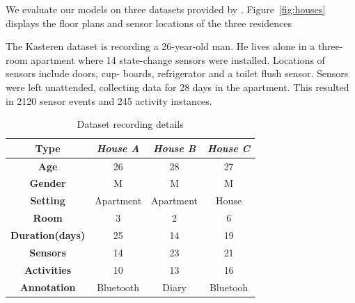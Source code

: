 We evaluate our models on three datasets provided by \cite{tvkasteren2010}.
Figure~\ref{fig:houses} displays the floor plans and sensor locations of the three residences 

The Kasteren dataset is recording a 26-year-old man. He lives alone in a three-room apartment where 14 state-change sensors were installed. Locations of sensors include doors, cup- boards, refrigerator and a toilet flush sensor. Sensors were left unattended, collecting data for 28 days in the apartment. This resulted in 2120 sensor events and 245 activity instances.


%

 
\begin{table}[t!]
\small
\begin{center}
\begin{tabular}{|c|c|c|c|}
\hline
\textbf{Type} & \emph{House A} & \emph{House B} & \emph{House C}\\ \hline
\textbf{Age} & 26 & 28 & 27\\ \hline
\textbf{Gender} & M & M & M\\ \hline
\textbf{Setting} & Apartment & Apartment & House\\ \hline
\textbf{Room} & 3 & 2 & 6\\ \hline
\textbf{Duration(days)} & 25 & 14 & 19\\ \hline
\textbf{Sensors} & 14 & 23 & 21\\ \hline
\textbf{Activities} & 10 & 13 & 16\\ \hline
\textbf{Annotation} & Bluetooth & Diary & Bluetooh\\ \hline
\end{tabular}
\end{center}
\caption{Dataset recording details}
\label{table:datasets}
\vspace{-0.3cm}
\end{table}




